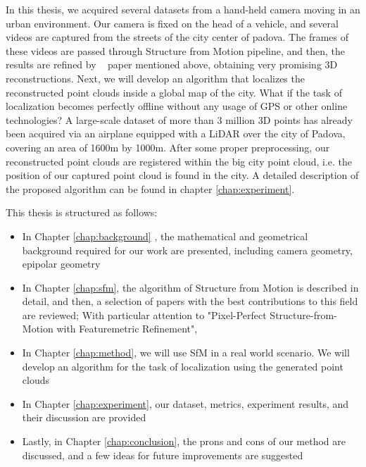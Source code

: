 \documentclass[11pt]{article}
\begin{document}
    In this thesis, we acquired several datasets from a hand-held camera moving in an urban environment. Our camera is fixed on the head of a vehicle, and several videos are captured from the streets of the city center of padova. The frames of these videos are passed through Structure from Motion pipeline, and then, the results are refined by ~\cite{lindenberger2021pixsfm} paper mentioned above, obtaining very promising 3D reconstructions.
   Next, we will develop an algorithm that localizes the reconstructed point clouds inside a global map of the city. What if the task of localization becomes perfectly offline without any usage of GPS or other online technologies?
    A large-scale dataset of more than 3 million 3D points has already been acquired via an airplane equipped with a LiDAR over the city of Padova,
    covering an area of 1600m by 1000m. After some
    proper preprocessing, our reconstructed  point clouds are registered within the big city point cloud, i.e. the position of our captured point cloud is found in the city. A detailed description of the proposed algorithm can be found in
    chapter \ref{chap:experiment}.

    This thesis is structured as follows:
    \begin{itemize}
        \item In Chapter \ref{chap:background} , the mathematical and geometrical background required for our work are presented, including camera geometry, epipolar geometry
        \item In Chapter \ref{chap:sfm}, the algorithm of Structure from Motion is described in detail, and then, a selection of papers with the best contributions to this field are reviewed; With particular attention to "Pixel-Perfect Structure-from-Motion with Featuremetric Refinement", ~\cite{lindenberger2021pixsfm}
        \item In Chapter \ref{chap:method}, we will use SfM in a real world scenario. We will develop an algorithm for the task of localization using the generated point clouds
        \item In Chapter \ref{chap:experiment}, our dataset, metrics, experiment results, and their discussion are provided
        \item Lastly, in Chapter \ref{chap:conclusion}, the prons and cons of our method are discussed, and a few ideas for future improvements are suggested
    \end{itemize}
\end{document}
